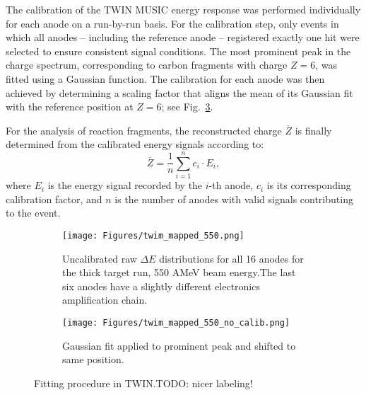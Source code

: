 The calibration of the TWIN MUSIC energy response was performed individually for each anode on a run-by-run basis. For the calibration step, only events in which all anodes -- including the reference anode -- registered exactly one hit were selected to ensure consistent signal conditions. The most prominent peak in the charge spectrum, corresponding to carbon fragments with charge \(Z = 6\), was fitted using a Gaussian function. The calibration for each anode was then achieved by determining a scaling factor that aligns the mean of its Gaussian fit with the reference position at \(Z = 6\); see Fig.~\ref{fig:calibration}.

For the analysis of reaction fragments, the reconstructed charge \(\overline{Z}\) is finally determined from the calibrated energy signals according to:
\begin{equation}
\overline{Z} = \frac{1}{n} \sum_{i=1}^{n} c_i \cdot E_i,
\end{equation}
where \(E_i\) is the energy signal recorded by the \(i\)-th anode, \(c_i\) is its corresponding calibration factor, and \(n\) is the number of anodes with valid signals contributing to the event.

\begin{figure}
     \centering
     \begin{subfigure}[t]{0.5\textwidth}
         \centering
         \texttt{[image: Figures/twim\_mapped\_550.png]}
         \caption{Uncalibrated raw $\Delta E$ distributions for all 16 anodes for the thick target run, 550 AMeV beam energy.The last six anodes have a slightly different electronics amplification chain.}
         \label{fig:raw_twim}
     \end{subfigure}
     \hfill
     \begin{subfigure}[t]{0.5\textwidth}
         \centering
         \texttt{[image: Figures/twim\_mapped\_550\_no\_calib.png]}
         \caption{Gaussian fit applied to prominent peak and shifted to same position.}
         \label{fig:cal_twim_one}
     \end{subfigure}
     \hfill
        \caption{Fitting procedure in TWIN.TODO: nicer labeling!}
        \label{fig:calibration}
\end{figure}
